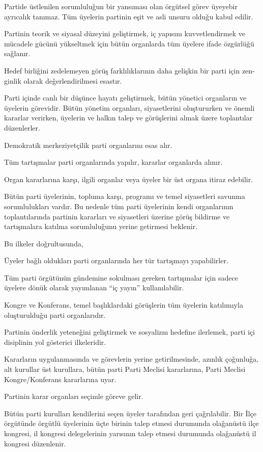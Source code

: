 \documentclass[11pt]{article} %
\begin{document}
Partide üstlenilen sorumluluǧun bir yansıması olan örgütsel görev üyeyebir ayrıcalık tanımaz. Tüm üyelerin partinin eşit ve asli unsuru olduǧu kabul edilir.

Partinin teorik ve siyasal düzeyini geliştirmek, iç yapısını kuvvetlendirmek ve mücadele gücünü yükseltmek için bütün organlarda tüm üyelere ifade özgürlüǧü saǧlanır.

Hedef birliǧini zedelemeyen görüş farklılıklarının daha gelişkin bir parti için zen-
ginlik olarak deǧerlendirilmesi esastır.

Parti içinde canlı bir düşünce hayatı geliştirmek, bütün yönetici organların ve üyelerin görevidir. Bütün yönetim organları, siyasetlerini oluştururken ve önemli kararlar verirken, üyelerin ve halkın talep ve görüşlerini almak üzere toplantılar düzenlerler.

Demokratik merkeziyetçilik parti organlarını esas alır.

Tüm tartışmalar parti organlarında yapılır, kararlar organlarda alınır.

Organ kararlarına karşı, ilgili organlar veya üyeler bir üst organa itiraz edebilir.

Bütün parti üyelerinin, topluma karşı, programı ve temel siyasetleri savunma sorumlulukları vardır. Bu nedenle tüm parti üyelerinin kendi organlarının toplantılarında partinin kararları ve siyasetleri üzerine görüş bildirme ve tartışmalara katılma sorumluluǧunu yerine getirmesi beklenir.

Bu ilkeler doǧrultusunda,

Üyeler baǧlı oldukları parti organlarında her tür tartışmayı yapabilirler.

Tüm parti örgütünün gündemine sokulması gereken tartışmalar için sadece üyelere dönük olarak yayımlanan “iç yayın” kullanılabilir.

Kongre ve Konferans, temel başlıklardaki görüşlerin tüm üyelerin katılımıyla oluşturulduǧu parti organlarıdır.

Partinin önderlik yeteneǧini geliştirmek ve sosyalizm hedefine ilerlemek, parti içi disiplinin yol gösterici ilkeleridir.

Kararların uygulanmasında ve görevlerin yerine getirilmesinde, azınlık çoǧunluǧa, alt kurullar üst kurullara, bütün parti Parti Meclisi kararlarına, Parti Meclisi Kongre/Konferans kararlarına uyar.

Partinin karar organları seçimle göreve gelir.

Bütün parti kurulları kendilerini seçen üyeler tarafından geri çaǧrılabilir. Bir İlçe örgütünde örgütlü üyelerinin üçte birinin talep etmesi durumunda olaǧanüstü ilçe kongresi, il kongresi delegelerinin yarısının talep etmesi durumunda olaǧanüstü il kongresi düzenlenir.
\end{document}
